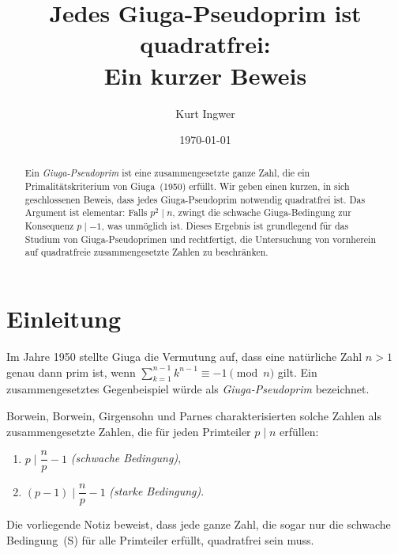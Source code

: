 \documentclass[12pt,a4paper]{amsart}
\theoremstyle{definition}
\begin{document}

\title{Jedes Giuga-Pseudoprim ist quadratfrei:\\ Ein kurzer Beweis}

\author{Kurt Ingwer}
\address{Specialist Mathematics Project, Version Build 44}
\date{\today}

\begin{abstract}
Ein \emph{Giuga-Pseudoprim} ist eine zusammengesetzte ganze Zahl, die ein
Primalitätskriterium von Giuga~(1950) erfüllt. Wir geben einen kurzen,
in sich geschlossenen Beweis, dass jedes Giuga-Pseudoprim notwendig quadratfrei ist.
Das Argument ist elementar: Falls $p^2 \mid n$, zwingt die schwache Giuga-Bedingung
zur Konsequenz $p \mid -1$, was unmöglich ist. Dieses Ergebnis ist grundlegend für
das Studium von Giuga-Pseudoprimen und rechtfertigt, die Untersuchung von vornherein
auf quadratfreie zusammengesetzte Zahlen zu beschränken.
\end{abstract}

\maketitle

\section{Einleitung}

Im Jahre 1950 stellte Giuga \cite{Giuga1950} die Vermutung auf, dass eine natürliche
Zahl $n > 1$ genau dann prim ist, wenn $\sum_{k=1}^{n-1} k^{n-1} \equiv -1 \pmod{n}$ gilt.
Ein zusammengesetztes Gegenbeispiel würde als \emph{Giuga-Pseudoprim} bezeichnet.

Borwein, Borwein, Girgensohn und Parnes \cite{Borwein1996} charakterisierten solche
Zahlen als zusammengesetzte Zahlen, die für jeden Primteiler $p \mid n$ erfüllen:
\begin{enumerate}
  \item[\textup{(S)}] $p \mid \dfrac{n}{p} - 1$ \quad \emph{(schwache Bedingung)},
  \item[\textup{(St)}] $(p-1) \mid \dfrac{n}{p} - 1$ \quad \emph{(starke Bedingung)}.
\end{enumerate}

Die vorliegende Notiz beweist, dass jede ganze Zahl, die sogar nur die schwache
Bedingung~(S) für alle Primteiler erfüllt, quadratfrei sein muss.
\end{document}
